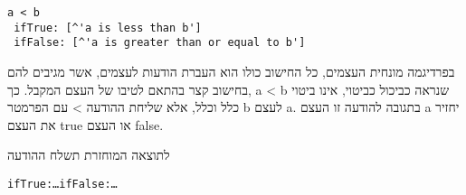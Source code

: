 \begin{verbatim}
a < b
 ifTrue: [^'a is less than b']
 ifFalse: [^'a is greater than or equal to b']
\end{verbatim}

          \begin{ציינון}
\item בפרדיגמה מונחית העצמים, כל החישוב כולו הוא העברת הודעות לעצמים, אשר
      מגיבים להם בחישוב קצר בהתאם לטיבו של העצם המקבל. כך, a < b שנראה
      כביכול כביטוי, אינו ביטוי כלל וכלל, אלא שליחת ההודעה > עם הפרמטר b
      לעצם a. בתגובה להודעה זו העצם a יחזיר את העצם true או העצם false.
  \end{ציינון}

    \begin{ציינון}
\item לתוצאה המוחזרת תשלח ההודעה
    \end{ציינון}

\begin{verbatim}
ifTrue:…ifFalse:…
\end{verbatim}

